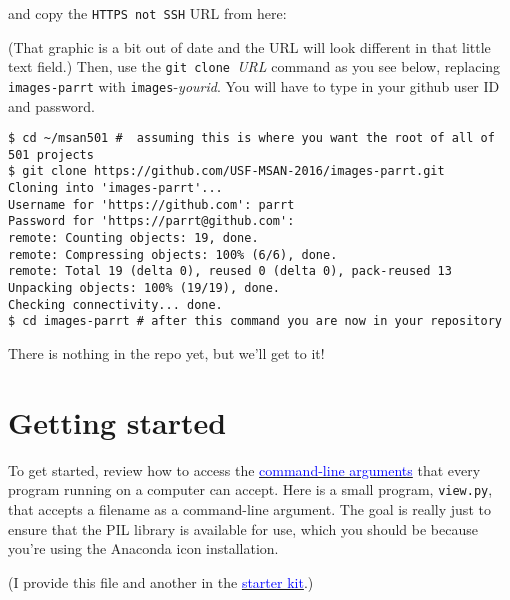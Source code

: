 \documentclass[titlepage]{tufte-book}
\begin{document}
\noindent and copy the {\tt HTTPS not SSH} URL from here:


\noindent (That graphic is a bit out of date and the URL will look different in that little text field.) Then, use the {\tt git clone }{\em URL} command as you see below, replacing {\tt images-parrt} with {\tt images}-{\em yourid}. You will have to type in your github user ID and password.

\begin{lstlisting}[style=BashInputStyle]
$ cd ~/msan501 #  assuming this is where you want the root of all of 501 projects
$ git clone https://github.com/USF-MSAN-2016/images-parrt.git
Cloning into 'images-parrt'...
Username for 'https://github.com': parrt
Password for 'https://parrt@github.com': 
remote: Counting objects: 19, done.
remote: Compressing objects: 100% (6/6), done.
remote: Total 19 (delta 0), reused 0 (delta 0), pack-reused 13
Unpacking objects: 100% (19/19), done.
Checking connectivity... done.
$ cd images-parrt # after this command you are now in your repository
\end{lstlisting}

\noindent There is nothing in the repo yet, but we'll get to it!

\section{Getting started}

To get started, review how to access the \href{http://stackoverflow.com/questions/4117530/sys-argv1-meaning-in-script}{\textcolor{blue}{command-line arguments}} that every program running on a computer can accept. Here is a small program, {\tt view.py}, that accepts a filename as a command-line argument. The goal is really just to ensure that the PIL library is available for use, which you should be because you're using the Anaconda icon installation.


\noindent (I provide this file and another in the \href{https://github.com/parrt/msan501-starterkit/tree/master/images}{\textcolor{blue}{starter kit}}.)
\end{document}
